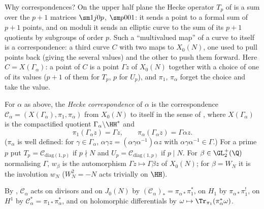 Why correspondences? On the upper half plane the Hecke operator $T_p$ of  is a sum over the $p+1$ matrices $\sm1j0p$, $\sm p001$: it sends a point to a formal sum of
$p+1$ points, and on moduli it sends an elliptic curve to the sum of its $p+1$ quotients by subgroups of order $p$. Such a ``multivalued map'' of a curve to itself is a
correspondence: a third curve $C$ with two maps to $X_0(N)$, one used to pull points back (giving the several values) and the other to push them forward. Here $C=X(\Gamma_\alpha)$:
a point of $C$ is a point $\Gamma z$ of $X_0(N)$ together with a choice of one of its values ($p+1$ of them for $T_p$, $p$ for $U_p$), and $\pi_1$, $\pi_\alpha$ forget the choice and
take the value.

\begin{definition}\label{def:moddeg:hecke-correspondence}
For $\alpha$ as above, the \emph{Hecke correspondence} of $\alpha$ is the correspondence $\mathcal C_\alpha=(X(\Gamma_\alpha),\pi_1,\pi_\alpha)$ from $X_0(N)$ to itself in the sense
of , where $X(\Gamma_\alpha)$ is the compactified quotient $\Gamma_\alpha\backslash\HH^*$ and
\[
\pi_1(\Gamma_\alpha z)=\Gamma z,\qquad\pi_\alpha(\Gamma_\alpha z)=\Gamma\alpha z.
\]
($\pi_\alpha$ is well defined: for $\gamma\in\Gamma_\alpha$, $\alpha\gamma z=(\alpha\gamma\alpha^{-1})\alpha z$ with $\alpha\gamma\alpha^{-1}\in\Gamma$.) For a prime $p$ put
$T_p=\mathcal C_{\mathrm{diag}(1,p)}$ if $p\nmid N$ and $U_p=\mathcal C_{\mathrm{diag}(1,p)}$ if $p\mid N$. For $\beta\in\GL_2^+(\Q)$ normalising $\Gamma$, $w_\beta$ is the automorphism
$\Gamma z\mapsto\Gamma\beta z$ of $X_0(N)$; for $\beta=W_N$ it is the involution $w_N$ ($W_N^2=-N$ acts trivially on $\HH$).
\end{definition}

By , $\mathcal C_\alpha$ acts on divisors and on $J_0(N)$ by $(\mathcal C_\alpha)_*=\pi_{\alpha*}\pi_1^*$, on $H_1$ by $\pi_{\alpha*}\pi_1^!$, on $H^1$ by
$\mathcal C_\alpha^*=\pi_{1*}\pi_\alpha^*$, and on holomorphic differentials by $\omega\mapsto\Tr_{\pi_1}(\pi_\alpha^*\omega)$.

